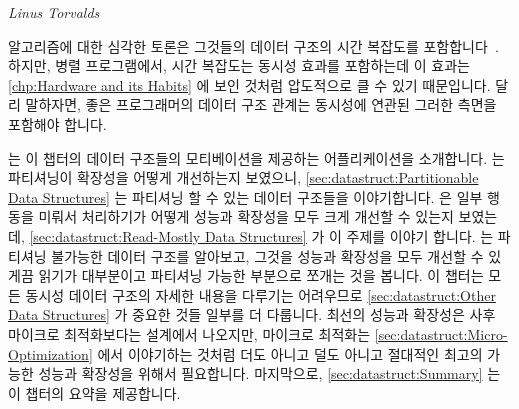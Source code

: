 
%
	 {\emph{Linus Torvalds}}

알고리즘에 대한 심각한 토론은 그것들의 데이터 구조의 시간 복잡도를
포함합니다~\cite{ThomasHCorman2001Algorithms}.
하지만, 병렬 프로그램에서, 시간 복잡도는 동시성 효과를 포함하는데 이 효과는
\cref{chp:Hardware and its Habits} 에 보인 것처럼 압도적으로 클 수 있기
때문입니다.
달리 말하자면, 좋은 프로그래머의 데이터 구조 관계는 동시성에 연관된 그러한
측면을 포함해야 합니다.

는 이 챕터의 데이터 구조들의 모티베이션을 제공하는 어플리케이션을 소개합니다.
 는 파티셔닝이 확장성을
어떻게 개선하는지 보였으니,
\cref{sec:datastruct:Partitionable Data Structures}
는 파티셔닝 할 수 있는 데이터 구조들을 이야기합니다.
 은 일부 행동을 미뤄서 처리하기가 어떻게 성능과
확장성을 모두 크게 개선할 수 있는지 보였는데,
\cref{sec:datastruct:Read-Mostly Data Structures} 가 이 주제를 이야기 합니다.
는 파티셔닝 불가능한 데이터 구조를 알아보고, 그것을 성능과 확장성을 모두 개선할
수 있게끔 읽기가 대부분이고 파티셔닝 가능한 부분으로 쪼개는 것을 봅니다.
이 챕터는 모든 동시성 데이터 구조의 자세한 내용을 다루기는 어려우므로
\cref{sec:datastruct:Other Data Structures}
가 중요한 것들 일부를 더 다룹니다.
최선의 성능과 확장성은 사후 마이크로 최적화보다는 설계에서 나오지만, 마이크로
최적화는
\cref{sec:datastruct:Micro-Optimization} 에서 이야기하는 것처럼 더도 아니고
덜도 아니고 절대적인 최고의 가능한 성능과 확장성을 위해서 필요합니다.
마지막으로, \cref{sec:datastruct:Summary} 는 이 챕터의 요약을 제공합니다.

\iffalse

